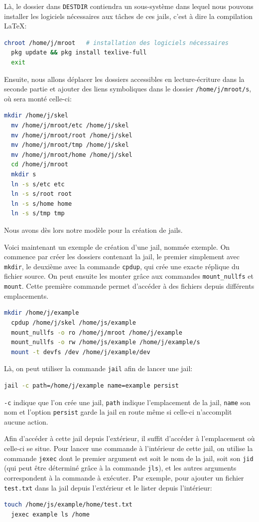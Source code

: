 \documentclass[10pt,a4paper]{article}
\begin{document}
Là, le dossier dans \texttt{DESTDIR} contiendra un sous-système dans lequel nous pouvons installer les logiciels nécessaires aux tâches de ces jails, c'est à dire la compilation \LaTeX:
\begin{lstlisting}[language=bash]
  chroot /home/j/mroot   # installation des logiciels nécessaires
  pkg update && pkg install texlive-full
  exit
\end{lstlisting}

Ensuite, nous allons déplacer les dossiers accessibles en lecture-écriture dans la seconde partie et ajouter des liens symboliques dans le dossier \texttt{/home/j/mroot/s}, où sera monté celle-ci:
\begin{lstlisting}[language=bash]
  mkdir /home/j/skel
  mv /home/j/mroot/etc /home/j/skel
  mv /home/j/mroot/root /home/j/skel
  mv /home/j/mroot/tmp /home/j/skel
  mv /home/j/mroot/home /home/j/skel
  cd /home/j/mroot
  mkdir s
  ln -s s/etc etc
  ln -s s/root root
  ln -s s/home home
  ln -s s/tmp tmp
\end{lstlisting}
Nous avons dès lors notre modèle pour la création de jails.

Voici maintenant un exemple de création d'une jail, nommée exemple.
On commence par créer les dossiers contenant la jail, le premier simplement avec \texttt{mkdir},
le deuxième avec la commande \texttt{cpdup}, qui crée une exacte réplique du fichier source.
On peut ensuite les monter grâce aux commandes \texttt{mount\_nullfs} et \texttt{mount}.
Cette première commande permet d'accéder à des fichiers depuis différents emplacements.

\begin{lstlisting}[language=bash]
  mkdir /home/j/example
  cpdup /home/j/skel /home/js/example
  mount_nullfs -o ro /home/j/mroot /home/j/example
  mount_nullfs -o rw /home/js/example /home/j/example/s
  mount -t devfs /dev /home/j/example/dev
\end{lstlisting}
Là, on peut utiliser la commande \texttt{jail} afin de lancer une jail:
\begin{lstlisting}[language=bash]
  jail -c path=/home/j/example name=example persist
\end{lstlisting}
\texttt{-c} indique que l'on crée une jail, \texttt{path} indique l'emplacement de la jail,
\texttt{name} son nom et l'option \texttt{persist} garde la jail en route même si celle-ci n'accomplit aucune action.

Afin d'accéder à cette jail depuis l'extérieur, il suffit d'accéder à l'emplacement où celle-ci se situe.
Pour lancer une commande à l'intérieur de cette jail,
on utilise la commande \texttt{jexec} dont le premier argument est soit le nom de la jail,
soit son \texttt{jid} (qui peut être déterminé grâce à la commande \texttt{jls}),
et les autres arguments correspondent à la commande à exécuter.
Par exemple, pour ajouter un fichier \texttt{test.txt} dans la jail depuis l'extérieur et le lister depuis l'intérieur:
\begin{lstlisting}[language=bash]
  touch /home/js/example/home/test.txt
  jexec example ls /home
\end{lstlisting}
\end{document}
